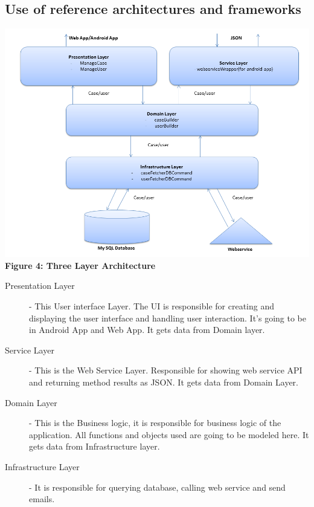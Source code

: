 \documentclass[10pt,a4paper]{article}
\begin{document}
\subsection{Use of reference architectures and frameworks}

\begin{center}
\includegraphics[scale=0.4]{Framework.png}
\textbf{Figure 4: Three Layer Architecture}
\end{center}


\begin{description}
\item [Presentation Layer]
- This User interface Layer. The UI is responsible for creating and displaying the user interface and handling user interaction. It’s going to be in Android App and Web App. It gets data from Domain layer.


\item [Service Layer]


- This is the Web Service Layer. Responsible for showing web service API and returning method results as JSON. It gets data from Domain Layer.


\item [Domain Layer]


- This is the Business logic, it is responsible for business logic of the application. All functions and objects used are going to be modeled here. It gets data from Infrastructure layer.


\item [Infrastructure Layer]


- It is responsible for querying database, calling web service and send emails.

\end{description}
\end{document}
